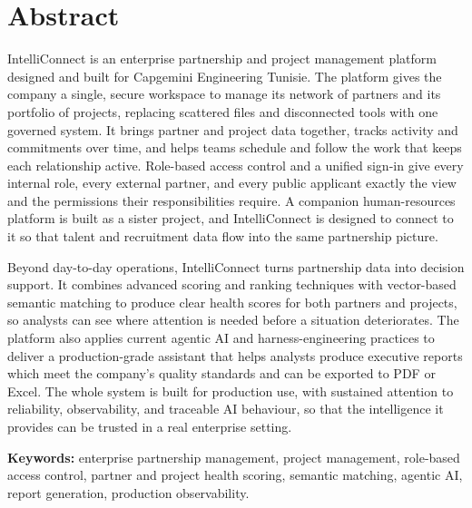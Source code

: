 \chapter*{Abstract}

IntelliConnect is an enterprise partnership and project management platform designed and built for Capgemini Engineering Tunisie. The platform gives the company a single, secure workspace to manage its network of partners and its portfolio of projects, replacing scattered files and disconnected tools with one governed system. It brings partner and project data together, tracks activity and commitments over time, and helps teams schedule and follow the work that keeps each relationship active. Role-based access control and a unified sign-in give every internal role, every external partner, and every public applicant exactly the view and the permissions their responsibilities require. A companion human-resources platform is built as a sister project, and IntelliConnect is designed to connect to it so that talent and recruitment data flow into the same partnership picture.

Beyond day-to-day operations, IntelliConnect turns partnership data into decision support. It combines advanced scoring and ranking techniques with vector-based semantic matching to produce clear health scores for both partners and projects, so analysts can see where attention is needed before a situation deteriorates. The platform also applies current agentic AI and harness-engineering practices to deliver a production-grade assistant that helps analysts produce executive reports which meet the company's quality standards and can be exported to PDF or Excel. The whole system is built for production use, with sustained attention to reliability, observability, and traceable AI behaviour, so that the intelligence it provides can be trusted in a real enterprise setting.

\bigskip
\noindent\textbf{Keywords:} enterprise partnership management, project management, role-based access control, partner and project health scoring, semantic matching, agentic AI, report generation, production observability.
